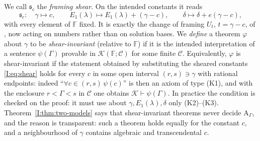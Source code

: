 \documentclass[11pt,a4paper]{article}
\newcommand{\Fld}{\mathbb F}
\newcommand{\Th}{\mathcal K}
\newcommand{\shear}{\mathfrak s}
\theoremstyle{definition}
\theoremstyle{remark}
\numberwithin{equation}{section}
\begin{document}
We call $\shear_c$ the \emph{framing shear}. On the intended constants it reads
\begin{equation}\label{I:eq:shear}
 \shear_c:\quad \gamma\mapsto c,\qquad E_1(\lambda)\mapsto E_1(\lambda)+(\gamma-c),
 \qquad \delta\mapsto\delta+e(\gamma-c),
\end{equation}
with every element of $\Fld$ fixed. It is exactly the change of framing $U_t$,
$t=\gamma-c$, of \cite[Thm.~``Euler Stokes-framing barrier'']{K002}, now acting on
numbers rather than on solution bases. We \emph{define} a theorem $\varphi$ about
$\gamma$ to be \emph{shear-invariant} (relative to $\Fld$) if it is the intended
interpretation of a sentence $\psi(\Gamma)$ provable in $\Th(\Fld;\mathcal C)$ for some
finite $\mathcal C$. Equivalently, $\varphi$ is shear-invariant if the statement obtained
by substituting the sheared constants \eqref{I:eq:shear} holds for every $c$ in some open
interval $(r,s)\ni\gamma$ with rational endpoints: indeed
``$\forall c\in(r,s)\,\psi(c)$'' is then an axiom of type (K1), and with the enclosure
$r<\Gamma<s$ in $\mathcal C$ one obtains $\Th\vdash\psi(\Gamma)$. In practice the
condition is checked on the proof: it must use about $\gamma,E_1(\lambda),\delta$ only
(K2)--(K3). Theorem~\ref{I:thm:two-models} says that shear-invariant theorems never decide
$\mathrm A_\Gamma$, and the reason is transparent: such a theorem holds equally for the
constant $c$, and a neighbourhood of $\gamma$ contains algebraic and transcendental $c$.
\end{document}
